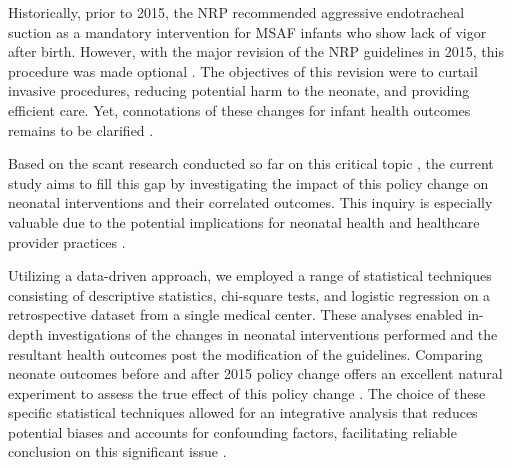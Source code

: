 \documentclass[11pt]{article}
\begin{document}
Historically, prior to 2015, the NRP recommended aggressive endotracheal suction as a mandatory intervention for MSAF infants who show lack of vigor after birth. However, with the major revision of the NRP guidelines in 2015, this procedure was made optional \cite{Sweet2023EuropeanCG, Course2020ManagementOR, Lee2016ReductionOB}. The objectives of this revision were to curtail invasive procedures, reducing potential harm to the neonate, and providing efficient care. Yet, connotations of these changes for infant health outcomes remains to be clarified \cite{Rochwerg2017OfficialEC}. 

Based on the scant research conducted so far on this critical topic \cite{Pados2020SystematicRO,Liu2002DeliveryRR}, the current study aims to fill this gap by investigating the impact of this policy change on neonatal interventions and their correlated outcomes. This inquiry is especially valuable due to the potential implications for neonatal health and healthcare provider practices \cite{Kahraman2020TheEO, Maghaireh2016SystematicRO}. 

Utilizing a data-driven approach, we employed a range of statistical techniques consisting of descriptive statistics, chi-square tests, and logistic regression on a retrospective dataset from a single medical center. These analyses enabled in-depth investigations of the changes in neonatal interventions performed and the resultant health outcomes post the modification of the guidelines. Comparing neonate outcomes before and after 2015 policy change offers an excellent natural experiment to assess the true effect of this policy change \cite{Ferraz2020BundleTR, Zauche2019PredictorsOP, Burke2018SystematicRO}. The choice of these specific statistical techniques allowed for an integrative analysis that reduces potential biases and accounts for confounding factors, facilitating reliable conclusion on this significant issue \cite{Krivitski2008TheoryAI, Melnyk2008MaternalAA, Saiman2003AnOO}.
\end{document}

